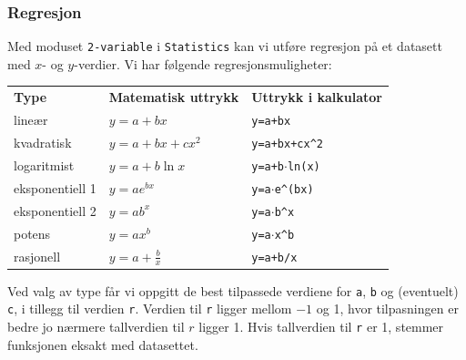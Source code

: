 \subsubsection*{Regresjon}
Med moduset \texttt{2-variable} i \texttt{Statistics} kan vi utføre regresjon på et datasett med $x$- og $y$-verdier. Vi har følgende regresjonsmuligheter: \\
\begin{center}
	\begin{tabular}{l| l | l}
		\textbf{Type} & \textbf{Matematisk uttrykk} & \textbf{Uttrykk i kalkulator} \\
		lineær &  $y=a+bx$ &	\texttt{y=a+bx} \\
		kvadratisk & $y=a+bx+cx^2$ & \texttt{y=a+bx+cx\textasciicircum2} \\
		logaritmist & $y=a+b\ln x$ & \texttt{y=a+b$\cdot$ln(x)} \\
		eksponentiell 1 & $y=ae^{bx}$ & \texttt{y=a$\cdot$e\textasciicircum(bx)} \\
		eksponentiell 2 & $y=ab^x$ & \texttt{y=a$\cdot$b\textasciicircum x} \\
		potens & $y=ax^b$ & \texttt{y=a$\cdot$x\textasciicircum b} \\
		rasjonell & $y=a+\frac{b}{x}$ & \texttt{y=a+b/x}
	\end{tabular} 
\end{center}
Ved valg av type får vi oppgitt de best tilpassede verdiene for \texttt{a}, \texttt{b} og (eventuelt) \texttt{c}, i tillegg til verdien \texttt{r}. Verdien til \texttt{r} ligger mellom $-1$ og 1, hvor tilpasningen er bedre jo nærmere tallverdien til $r$ ligger 1. Hvis tallverdien til \texttt{r} er 1, stemmer funksjonen eksakt med datasettet.

